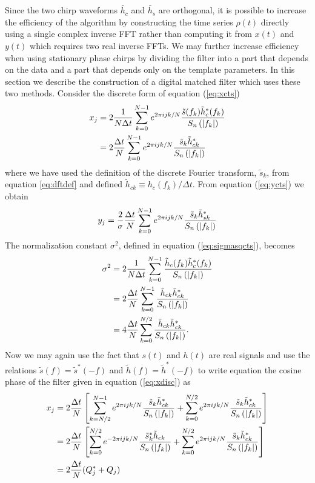 Since the two chirp waveforms $\tilde{h_c}$ and $\tilde{h_s}$ are 
orthogonal, it is possible to increase the efficiency of the algorithm by
constructing the time series $\rho(t)$ directly using a single complex inverse
FFT rather than computing it from $x(t)$ and $y(t)$ which requires two real
inverse FFTs. We may further increase efficiency when using stationary phase
chirps by dividing the filter into a part that depends on the data and a part
that depends only on the template parameters. In this section we describe the
construction of a digital matched filter which uses these two methods.
Consider the discrete form of equation (\ref{eq:xcts})
\begin{equation}
\begin{split}
\label{eq:xdisc}
x_j &= 2 \frac{1}{N\Delta t} \sum_{k=0}^{N-1} e^{2\pi ijk/N} 
\frac{\tilde{s}(f_k) \tilde{h}_{c}^\ast(f_k)}{S_n\left(\left|f_{k}\right|\right)} \\
&=
2 \frac{\Delta t}{N} \sum_{k=0}^{N-1} e^{2\pi ijk/N} 
\frac{\tilde{s}_k \tilde{h}_{ck}^\ast} {S_n\left(\left|f_{k}\right|\right)}
\end{split}
\end{equation}
where we have used the definition of the discrete Fourier transform,
$\tilde{s}_k$, from equation \ref{eq:dftdef} and defined 
$\tilde{h}_{ck} \equiv {h}_c(f_k) / \Delta t$. From equation
(\ref{eq:ycts}) we obtain
\begin{equation}
\label{eq:ydisc}
y_j = \frac{2}{\sigma} \frac{\Delta t}{N} \sum_{k=0}^{N-1} e^{2\pi ijk/N} 
\frac{\tilde{s}_k \tilde{h}_{sk}^\ast} {S_n\left(\left|f_{k}\right|\right)}
\end{equation}
The normalization constant $\sigma^2$, defined in equation
(\ref{eq:sigmasqcts}), becomes
\begin{equation}
\begin{split}
\label{eq:sigmasqdisc}
\sigma^2 &= 2 \frac{1}{N\Delta t} \sum_{k=0}^{N-1}
\frac{\tilde{h}_{c}(f_k)\tilde{h}_{c}^\ast(f_k)}{S_n\left(\left|f_{k}\right|\right)}  \\
&=
2 \frac{\Delta t}{N} \sum_{k=0}^{N-1}
\frac{\tilde{h}_{ck}\tilde{h}_{ck}^\ast}{S_n\left(\left|f_{k}\right|\right)} \\
&=
4 \frac{\Delta t}{N} \sum_{k=0}^{N/2}
\frac{\tilde{h}_{ck}\tilde{h}_{ck}^\ast}{S_n\left(\left|f_{k}\right|\right)}.
\end{split}
\end{equation}
Now we may again use the fact that $s(t)$ and $h(t)$ are  real signals and use
the relations $\tilde{s}(f) = \tilde{s}^\ast(-f)$ and $\tilde{h}(f) =
\tilde{h}^\ast(-f)$  to write equation the cosine phase of the filter given in
equation (\ref{eq:xdisc}) as
\begin{equation}
\begin{split}
x_j &= 
2\frac{\Delta t}{N}
\left[
  \sum_{k=N/2}^{N-1} e^{2\pi ijk/N} 
  \frac{\tilde{s}_k \tilde{h}_{ck}^\ast}{S_n\left(\left|f_{k}\right|\right)}
  +
  \sum_{k=0}^{N/2} e^{2\pi ijk/N} 
  \frac{\tilde{s}_k \tilde{h}_{ck}^\ast}{S_n\left(\left|f_{k}\right|\right)}
\right] \\
&= 2\frac{\Delta t}{N}
\left[
  \sum_{k=0}^{N/2} e^{-2\pi ijk/N} 
  \frac{\tilde{s}_k^\ast \tilde{h}_{ck}}{S_n\left(\left|f_{k}\right|\right)}
  +
  \sum_{k=0}^{N/2} e^{2\pi ijk/N} 
  \frac{\tilde{s}_k \tilde{h}_{ck}^\ast}{S_n\left(\left|f_{k}\right|\right)}
\right] \\
&= 2\frac{\Delta t}{N}(Q_j^\ast + Q_j)
\end{split}
\end{equation}
